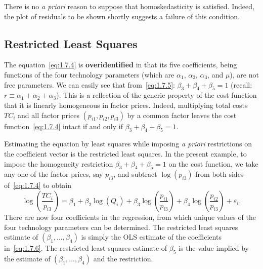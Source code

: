 There is no \emph{a priori} reason to suppose that homoskedasticity is satisfied.
Indeed, the plot of residuals to be shown shortly suggests a failure of this condition.

\subsection*{Restricted Least Squares}

The equation~\eqref{eq:1.7.4} is \textbf{overidentified} in that its five coefficients,
being functions of the four technology parameters (which are $\alpha_1$, $\alpha_2$,
$\alpha_3$, and $\mu$), are not free parameters.  We can easily see that
from~\eqref{eq:1.7.5}: $\beta_3 + \beta_4 + \beta_5 = 1$ (recall:
$r \equiv \alpha_1 + \alpha_2 + \alpha_3$).  This is a reflection of the generic
property of the cost function that it is linearly homogeneous in factor prices.  Indeed,
multiplying total costs $TC_i$ and all factor prices $(p_{i1}, p_{i2}, p_{i3})$ by a
common factor leaves the cost function~\eqref{eq:1.7.4} intact if and only if
$\beta_3 + \beta_4 + \beta_5 = 1$.

Estimating the equation by least squares while imposing \emph{a priori} restrictions on
the coefficient vector is the restricted least squares.  In the present example, to
impose the homogeneity restriction $\beta_3 + \beta_4 + \beta_5 = 1$ on the cost
function, we take any one of the factor prices, say $p_{i3}$, and subtract
$\log(p_{i3})$ from both sides of~\eqref{eq:1.7.4} to obtain
\begin{equation}
  \log\!\left(\frac{TC_i}{p_{i3}}\right)
  = \beta_1 + \beta_2 \log(Q_i) + \beta_3 \log\!\left(\frac{p_{i1}}{p_{i3}}\right)
    + \beta_4 \log\!\left(\frac{p_{i2}}{p_{i3}}\right) + \varepsilon_i.
  \label{eq:1.7.6}
\end{equation}
There are now four coefficients in the regression, from which unique values of the four
technology parameters can be determined.  The restricted least squares estimate of
$(\beta_1, \ldots, \beta_4)$ is simply the OLS estimate of the coefficients
in~\eqref{eq:1.7.6}.  The restricted least squares estimate of $\beta_5$ is the value
implied by the estimate of $(\beta_1, \ldots, \beta_4)$ and the restriction.
